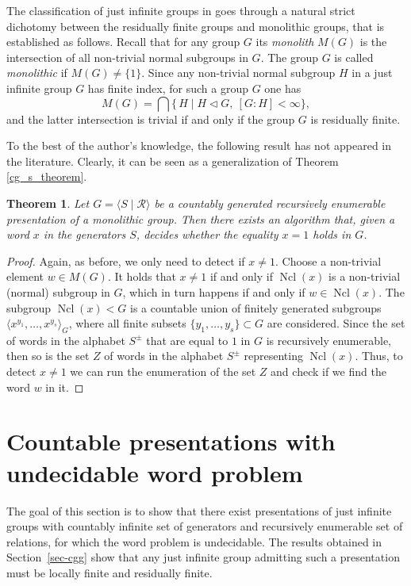 \documentclass[12pt,a4paper]{amsart}
\newtheorem{theorem}{Theorem}
\DeclareMathOperator{\Ncl}{Ncl}
\begin{document}
The classification of just infinite groups in \cite{Wilson1971} goes through a natural strict dichotomy between the residually finite groups and monolithic groups, that is established as follows. Recall that for any group $G$ its \emph{monolith} $M(G)$ is the intersection of all non-trivial normal subgroups in $G$. The group $G$ is called \emph{monolithic} if $M(G)\ne \{1\}$. Since any non-trivial normal subgroup $H$ in a just infinite group $G$ has finite index, for such a group $G$ one has
\[M(G)=\bigcap \{ \,H \mid H \triangleleft G, \ [G:H]<\infty\},\]
and the latter intersection is trivial if and only if the group $G$ is residually finite.

\smallskip

To the best of the author's knowledge, the following result has not appeared in the literature. Clearly, it can be seen as a generalization of Theorem \ref{cg_s_theorem}. 

\begin{theorem}
\label{cg_m_theorem}
    Let $G=\langle S \mid \mathcal{R} \rangle$ be a countably generated recursively enumerable presentation of a monolithic group. Then there exists an algorithm that, given a word $x$ in the generators $S$, decides whether the equality $x=1$ holds in $G$.
\end{theorem}
\begin{proof}
Again, as before, we only need to detect if $x\ne 1$. Choose a non-trivial element $w\in M(G)$. It holds that $x\ne 1$ if and only if $\Ncl(x)$ is a non-trivial (normal) subgroup in $G$, which in turn happens if and only if $w\in \Ncl(x)$. The subgroup $\Ncl(x)<G$ is a countable union of finitely generated subgroups $\langle x^{y_1},\ldots,x^{y_s}\rangle_G$, where all finite subsets $\{y_1,\ldots,y_s\}\subset G$ are considered. Since the set of words in the alphabet $S^{\pm}$ that are equal to $1$ in $G$ is recursively enumerable, then so is the set $Z$ of words in the alphabet $S^{\pm}$ representing $\Ncl(x)$. Thus, to detect $x\ne 1$ we can run the enumeration of the set $Z$ and check if we find the word $w$ in it.
\end{proof}

\section{Countable presentations with undecidable word problem}
The goal of this section is to show that there exist presentations of just infinite groups with countably infinite set of generators and recursively enumerable set of relations, for which the word problem is undecidable. The results obtained in Section~\ref{sec-cgg} show that any just infinite group admitting such a presentation must be locally finite and residually finite.
\end{document}
